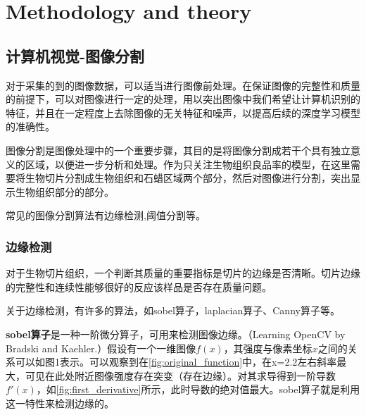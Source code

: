 \section{Methodology and theory}
\label{sec:problem_description}

\subsection{计算机视觉-图像分割}

对于采集的到的图像数据，可以适当进行图像前处理。在保证图像的完整性和质量的前提下，可以对图像进行一定的处理，用以突出图像中我们希望让计算机识别的特征，并且在一定程度上去除图像的无关特征和噪声，以提高后续的深度学习模型的准确性。

图像分割是图像处理中的一个重要步骤，其目的是将图像分割成若干个具有独立意义的区域，以便进一步分析和处理。作为只关注生物组织良品率的模型，在这里需要将生物切片分割成生物组织和石蜡区域两个部分，然后对图像进行分割，突出显示生物组织部分的部分。

常见的图像分割算法有边缘检测,阈值分割等。

\subsubsection{边缘检测}
对于生物切片组织，一个判断其质量的重要指标是切片的边缘是否清晰。切片边缘的完整性和连续性能够很好的反应该样品是否存在质量问题。

关于边缘检测，有许多的算法，如sobel算子，laplacian算子、Canny算子等。\cite{3.1}

\textbf{sobel算子}是一种一阶微分算子，可用来检测图像边缘。（Learning OpenCV by Bradski and Kaehler.）假设有一个一维图像$f(x)$，其强度与像素坐标$x$之间的关系可以如图1表示。可以观察到在\autoref{fig:original_function}中，在x=2.2左右斜率最大，可见在此处附近图像强度存在突变（存在边缘）。对其求导得到一阶导数$f'(x)$，如\autoref{fig:first_derivative}所示，此时导数的绝对值最大。sobel算子就是利用这一特性来检测边缘的。

